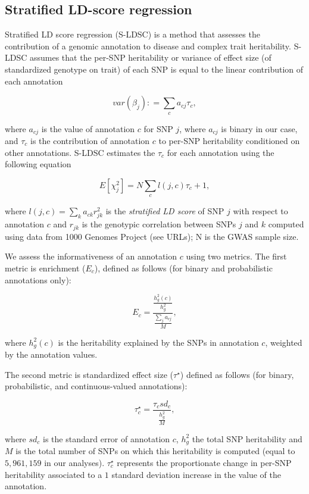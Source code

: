 \subsection*{Stratified LD-score regression}

Stratified LD score regression (S-LDSC) is a method that assesses the contribution of a genomic annotation to disease and complex trait heritability\cite{ Finucane2015, gazal2017}. S-LDSC assumes that the per-SNP heritability or variance of effect size (of standardized genotype on trait) of each SNP is equal to the linear contribution of each annotation

\begin{equation}\label{eq:varbeta}
    var \left ( \beta_j \right ) : = \sum_{c} a_{cj} \tau_{c},
\end{equation}

where $a_{cj}$ is the value of annotation $c$ for SNP $j$, where $a_{cj}$ is binary in our case, and $\tau_{c}$ is the contribution of annotation $c$ to per-SNP heritability conditioned on other annotations. S-LDSC estimates the $\tau_{c}$ for each annotation using the following equation

\begin{equation}\label{eq:chi}
    E \left [ \chi^2_{j} \right ] = N \sum_{c} l(j, c) \tau_c + 1,
\end{equation}

where $l(j, c) = \sum_{k} a_{ck} r^2_{jk}$ is the \emph{stratified LD score} of SNP $j$ with respect to annotation $c$ and $r_{jk}$ is the genotypic correlation between SNPs $j$ and $k$ computed using data from 1000 Genomes Project\cite{1000G2015} (see URLs);  N is the GWAS sample size. 

We assess the informativeness of an annotation $c$ using two metrics. The first metric is enrichment ($E_c$), defined as follows (for binary and probabilistic annotations only):

\begin{equation}\label{eq:enrich}
    E_c = \frac{\frac{h^2_{g} (c)}{h^2_{g}}}{\frac{\sum_{j} a_{cj}}{M}},
\end{equation}

where $h^2_{g} (c)$ is the heritability explained by the SNPs in annotation $c$, weighted by the annotation values. 

The second metric is standardized effect size ($\tau^{\star}$) defined as follows (for binary, probabilistic, and continuous-valued annotations):

\begin{equation}\label{eq:taustar}
    \tau^{\star}_{c} = \frac{\tau_c sd_c}{\frac{h^2_{g}}{M}},
\end{equation}

where $sd_c$ is the standard error of annotation $c$, $h^2_{g}$ the total SNP heritability and $M$ is the total number of SNPs on which this heritability is computed (equal to $5,961,159$ in our analyses). $\tau^{\star}_{c}$ represents the proportionate change in per-SNP heritability associated to a $1$ standard deviation increase in the value of the annotation. 





